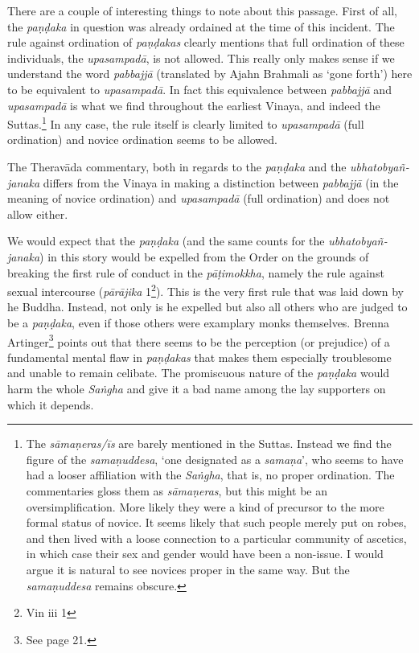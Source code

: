 There are a couple of interesting things to note about this passage. First of all, the {\em paṇḍaka} in question was already ordained at the time of this incident. The rule against ordination of {\em paṇḍakas} clearly mentions that full ordination of these individuals, the {\em upasampadā}, is not allowed. This really only makes sense if we understand the word {\em pabbajjā} (translated by Ajahn Brahmali as `gone forth') here to be equivalent to {\em upasampadā}. In fact this equivalence between {\em pabbajjā} and {\em upasampadā} is what we find throughout the earliest Vinaya, and indeed the Suttas.\footnote{The {\em sāmaṇeras/īs} are barely mentioned in the Suttas. Instead we find the figure of the {\em samaṇuddesa}, `one designated as a {\em samaṇa}', who seems to have had a looser affiliation with the {\em Saṅgha}, that is, no proper ordination. The commentaries gloss them as {\em sāmaṇeras}, but this might be an oversimplification. More likely they were a kind of precursor to the more formal status of novice. It seems likely that such people merely put on robes, and then lived with a loose connection to a particular community of ascetics, in which case their sex and gender would have been a non-issue. I would argue it is natural to see novices proper in the same way. But the {\em samaṇuddesa} remains obscure.} In any case, the rule itself is clearly limited to {\em upasampadā} (full ordination) and novice ordination seems to be allowed.

The Theravāda commentary, both in regards to the {\em paṇḍaka} and the {\em ubhatob­yañ­janaka} differs from the Vinaya in making a distinction between {\em pabbajjā} (in the meaning of novice ordination) and {\em upasampadā} (full ordination) and does not allow either.

We would expect that the {\em paṇḍaka} (and the same counts for the {\em ubhatob­yañ­janaka}) in this story would be expelled from the Order on the grounds of breaking the first rule of conduct in the {\em pāṭimokkha}, namely the rule against sexual intercourse ({\em pārājika} 1\footnote{Vin iii 1}). This is the very first rule that was laid down by he Buddha. Instead, not only is he expelled but also all others who are judged to be a {\em paṇḍaka}, even if those others were examplary monks themselves. Brenna Artinger\footnote{See \cite{artinger} page 21.} points out that there seems to be the perception (or prejudice) of a fundamental mental flaw in {\em paṇḍakas} that makes them especially troublesome and unable to remain celibate. The promiscuous nature of the {\em paṇḍaka} would harm the whole {\em Saṅgha} and give it a bad name among the lay supporters on which it depends.

